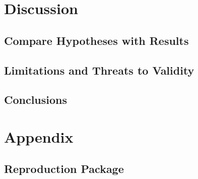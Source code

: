 \documentclass[unicode,11pt,a4paper,oneside,numbers=endperiod,openany]{scrartcl}
\begin{document}
\section{Discussion}

    \subsection{Compare Hypotheses with Results}


    \subsection{Limitations and Threats to Validity}


    \subsection{Conclusions}




\section{Appendix}

    \subsection{Reproduction Package}
\end{document}
